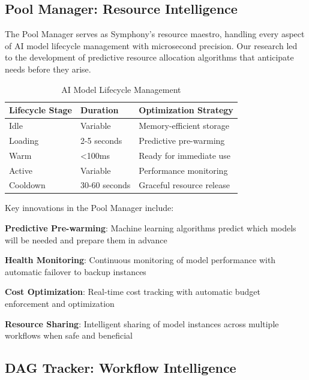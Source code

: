\subsection*{Pool Manager: Resource Intelligence}

The Pool Manager serves as Symphony's resource maestro, handling every aspect of AI model lifecycle management with microsecond precision. Our research led to the development of predictive resource allocation algorithms that anticipate needs before they arise.

\begin{table}[ht]
\centering
\begin{tabular}{@{}lll@{}}
\toprule
\textbf{Lifecycle Stage} & \textbf{Duration} & \textbf{Optimization Strategy} \\
\midrule
Idle & Variable & Memory-efficient storage \\
Loading & 2-5 seconds & Predictive pre-warming \\
Warm & <100ms & Ready for immediate use \\
Active & Variable & Performance monitoring \\
Cooldown & 30-60 seconds & Graceful resource release \\
\bottomrule
\end{tabular}
\caption{AI Model Lifecycle Management}
\end{table}

Key innovations in the Pool Manager include:

\begin{expandedlist}
    \item \textbf{Predictive Pre-warming}: Machine learning algorithms predict which models will be needed and prepare them in advance
    \item \textbf{Health Monitoring}: Continuous monitoring of model performance with automatic failover to backup instances
    \item \textbf{Cost Optimization}: Real-time cost tracking with automatic budget enforcement and optimization
    \item \textbf{Resource Sharing}: Intelligent sharing of model instances across multiple workflows when safe and beneficial
\end{expandedlist}

\subsection*{DAG Tracker: Workflow Intelligence}

